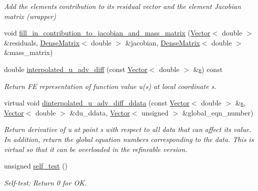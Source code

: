 \begin{DoxyCompactItemize}
\begin{DoxyCompactList}\small\item\em Add the element\textquotesingle{}s contribution to its residual vector and the element Jacobian matrix (wrapper) \end{DoxyCompactList}\item 
void \hyperlink{classoomph_1_1AdvectionDiffusionEquations_aed50fe00556434c01bc855766edeb564}{fill\+\_\+in\+\_\+contribution\+\_\+to\+\_\+jacobian\+\_\+and\+\_\+mass\+\_\+matrix} (\hyperlink{classoomph_1_1Vector}{Vector}$<$ double $>$ \&residuals, \hyperlink{classoomph_1_1DenseMatrix}{Dense\+Matrix}$<$ double $>$ \&jacobian, \hyperlink{classoomph_1_1DenseMatrix}{Dense\+Matrix}$<$ double $>$ \&mass\+\_\+matrix)
\item 
double \hyperlink{classoomph_1_1AdvectionDiffusionEquations_a2c5d80050fd9586bcf2d87951c346f58}{interpolated\+\_\+u\+\_\+adv\+\_\+diff} (const \hyperlink{classoomph_1_1Vector}{Vector}$<$ double $>$ \&\hyperlink{cfortran_8h_ab7123126e4885ef647dd9c6e3807a21c}{s}) const
\begin{DoxyCompactList}\small\item\em Return FE representation of function value u(s) at local coordinate s. \end{DoxyCompactList}\item 
virtual void \hyperlink{classoomph_1_1AdvectionDiffusionEquations_a7b264e70255fa420e443e60cbd8d7dbc}{dinterpolated\+\_\+u\+\_\+adv\+\_\+diff\+\_\+ddata} (const \hyperlink{classoomph_1_1Vector}{Vector}$<$ double $>$ \&\hyperlink{cfortran_8h_ab7123126e4885ef647dd9c6e3807a21c}{s}, \hyperlink{classoomph_1_1Vector}{Vector}$<$ double $>$ \&du\+\_\+ddata, \hyperlink{classoomph_1_1Vector}{Vector}$<$ unsigned $>$ \&global\+\_\+eqn\+\_\+number)
\begin{DoxyCompactList}\small\item\em Return derivative of u at point s with respect to all data that can affect its value. In addition, return the global equation numbers corresponding to the data. This is virtual so that it can be overloaded in the refineable version. \end{DoxyCompactList}\item 
unsigned \hyperlink{classoomph_1_1AdvectionDiffusionEquations_ac9f27a62a29a9c3c850505f4cb9c00b7}{self\+\_\+test} ()
\begin{DoxyCompactList}\small\item\em Self-\/test\+: Return 0 for OK. \end{DoxyCompactList}\end{DoxyCompactItemize}
